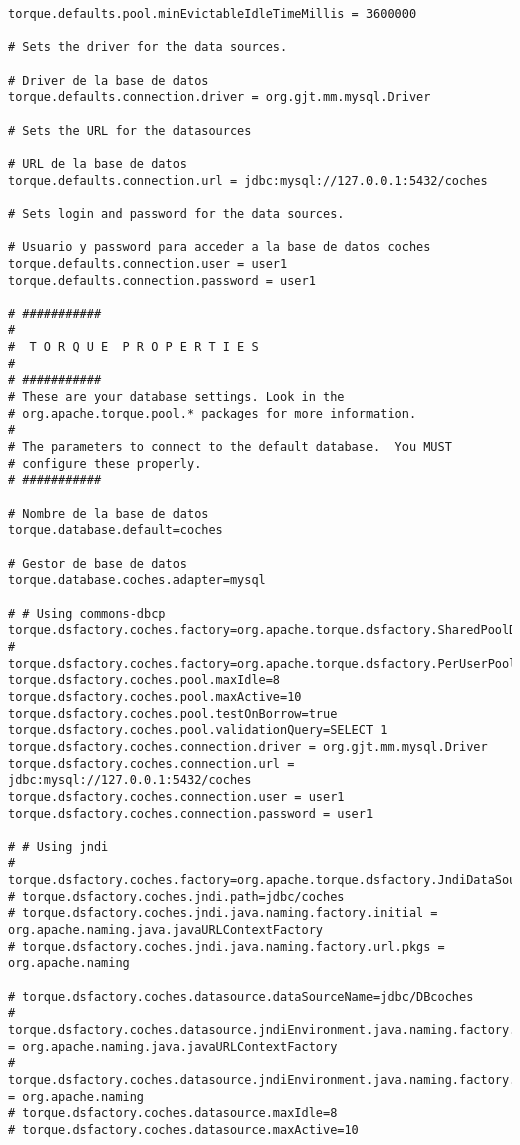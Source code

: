 \begin{lstlisting}
torque.defaults.pool.minEvictableIdleTimeMillis = 3600000

# Sets the driver for the data sources.

# Driver de la base de datos
torque.defaults.connection.driver = org.gjt.mm.mysql.Driver

# Sets the URL for the datasources

# URL de la base de datos
torque.defaults.connection.url = jdbc:mysql://127.0.0.1:5432/coches

# Sets login and password for the data sources.

# Usuario y password para acceder a la base de datos coches
torque.defaults.connection.user = user1
torque.defaults.connection.password = user1

# ###########
#
#  T O R Q U E  P R O P E R T I E S
#
# ###########
# These are your database settings. Look in the
# org.apache.torque.pool.* packages for more information.
#
# The parameters to connect to the default database.  You MUST
# configure these properly.
# ###########

# Nombre de la base de datos
torque.database.default=coches

# Gestor de base de datos
torque.database.coches.adapter=mysql

# # Using commons-dbcp
torque.dsfactory.coches.factory=org.apache.torque.dsfactory.SharedPoolDataSourceFactory
# torque.dsfactory.coches.factory=org.apache.torque.dsfactory.PerUserPoolDataSourceFactory
torque.dsfactory.coches.pool.maxIdle=8
torque.dsfactory.coches.pool.maxActive=10
torque.dsfactory.coches.pool.testOnBorrow=true
torque.dsfactory.coches.pool.validationQuery=SELECT 1
torque.dsfactory.coches.connection.driver = org.gjt.mm.mysql.Driver
torque.dsfactory.coches.connection.url = jdbc:mysql://127.0.0.1:5432/coches
torque.dsfactory.coches.connection.user = user1
torque.dsfactory.coches.connection.password = user1

# # Using jndi
# torque.dsfactory.coches.factory=org.apache.torque.dsfactory.JndiDataSourceFactory
# torque.dsfactory.coches.jndi.path=jdbc/coches
# torque.dsfactory.coches.jndi.java.naming.factory.initial = org.apache.naming.java.javaURLContextFactory
# torque.dsfactory.coches.jndi.java.naming.factory.url.pkgs = org.apache.naming

# torque.dsfactory.coches.datasource.dataSourceName=jdbc/DBcoches
# torque.dsfactory.coches.datasource.jndiEnvironment.java.naming.factory.initial = org.apache.naming.java.javaURLContextFactory
# torque.dsfactory.coches.datasource.jndiEnvironment.java.naming.factory.url.pkgs = org.apache.naming
# torque.dsfactory.coches.datasource.maxIdle=8
# torque.dsfactory.coches.datasource.maxActive=10


\end{lstlisting}
